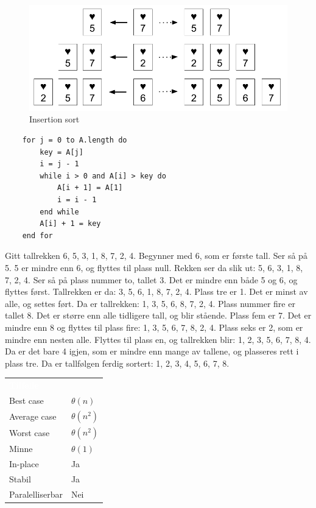 \begin{figure}[H]
\includegraphics[scale=0.5]{images/insertionsort}
\centering %
\caption{Insertion sort}
\label{fig:insertionsort}
\end{figure}

\begin{lstlisting}
    for j = 0 to A.length do
	    key = A[j]
	    i = j - 1
	    while i > 0 and A[i] > key do
	    	A[i + 1] = A[1]
	    	i = i - 1
	    end while
	    A[i] + 1 = key
    end for
\end{lstlisting}

\begin{boxed}
Gitt tallrekken 6, 5, 3, 1, 8, 7, 2, 4. Begynner med 6, som er første tall. Ser så på 5. 5 er mindre enn 6, og flyttes til plass null. Rekken ser da slik ut: 5, 6, 3, 1, 8, 7, 2, 4. Ser så på plass nummer to, tallet 3. Det er mindre enn både 5 og 6, og flyttes først. Tallrekken er da: 3, 5, 6, 1, 8, 7, 2, 4. Plass tre er 1. Det er minst av alle, og settes ført. Da er tallrekken: 1, 3, 5, 6, 8, 7, 2, 4. Plass nummer fire er tallet 8. Det er større enn alle tidligere tall, og blir stående. Plass fem er 7. Det er mindre enn 8 og flyttes til plass fire: 1, 3, 5, 6, 7, 8, 2, 4. Plass seks er 2, som er mindre enn nesten alle. Flyttes til plass en, og tallrekken blir: 1, 2, 3, 5, 6, 7, 8, 4. Da er det bare 4 igjen, som er mindre enn mange av tallene, og plasseres rett i plass tre. Da er tallfølgen ferdig sortert: 1, 2, 3, 4, 5, 6, 7, 8.
\end{boxed}

\begin{table}[H]
    \label{tab:bubblesort}
    \centering
    \begin{tabular}{|L{15em} | L{15em}|}
        \hline
        \textbf{\textcolor{white}{Tilfelle}} & \textbf{\textcolor{white}{}}\\
        Best case & $\theta(n)$\\
        Average case & $\theta(n^2)$\\
        Worst case & $\theta(n^2)$\\
        Minne & $\theta(1)$\\
        In-place & Ja\\
        Stabil & Ja\\
        Paralelliserbar & Nei\\
         \hline
    \end{tabular}
\end{table}

